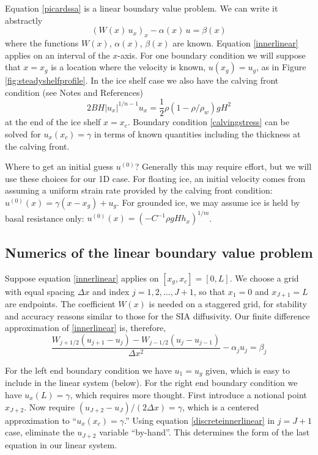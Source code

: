 \documentclass[letterpaper,final,12pt,reqno]{amsart}
\begin{document}
Equation \eqref{picardssa} is a linear boundary value problem.  We can write it abstractly
\begin{equation}
  \left(W(x)\, u_x\right)_x - \alpha(x)\, u = \beta(x)  \label{innerlinear}
\end{equation}
where the functions $W(x)$, $\alpha(x)$, $\beta(x)$ are known.  Equation \eqref{innerlinear} applies on an interval of the $x$-axis.  For one boundary condition we will suppose that $x=x_g$ is a location where the velocity is known, $u(x_g)=u_g$, as in Figure \ref{fig:steadyshelfprofile}.  In the ice shelf case we also have the calving front condition (see Notes and References)
\begin{equation}
  2 B H |u_x|^{1/n - 1} u_x = \frac{1}{2}\rho (1-\rho/\rho_w) g H^2  \label{calvingstress}
\end{equation}
at the end of the ice shelf $x=x_c$.  Boundary condition \eqref{calvingstress} can be solved for $u_x(x_c)=\gamma$ in terms of known quantities including the thickness at the calving front.

Where to get an initial guess $u^{(0)}$?  Generally this may require effort, but we will use these choices for our 1D case.  For floating ice, an initial velocity comes from assuming a uniform strain rate provided by the calving front condition: $u^{(0)}(x) = \gamma (x-x_g) + u_g$.  For grounded ice, we may assume ice is held by basal resistance only: $u^{(0)}(x) = \left(-C^{-1} \rho g H h_x\right)^{1/m}$.

\subsection*{Numerics of the linear boundary value problem}  Suppose equation \eqref{innerlinear} applies on $[x_g,x_c]=[0,L]$.  We choose a grid with equal spacing $\Delta x$ and index $j=1,2,\dots,J+1$, so that $x_1 = 0$ and $x_{J+1} = L$ are endpoints.  The coefficient $W(x)$ is needed on a staggered grid, for stability and accuracy reasons similar to those for the SIA diffusivity.  Our finite difference approximation of \eqref{innerlinear} is, therefore,
\begin{equation}
  \frac{W_{j+1/2} (u_{j+1} - u_j) - W_{j-1/2} (u_{j} - u_{j-1})}{\Delta x^2} - \alpha_j u_j = \beta_j  \label{discreteinnerlinear}
\end{equation}

For the left end boundary condition we have $u_1 = u_g$ given, which is easy to include in the linear system (below).  For the right end boundary condition we have $u_x(L)=\gamma$, which requires more thought.  First introduce a notional point $x_{J+2}$.  Now require $(u_{J+2} - u_J)/(2 \Delta x) = \gamma$, which is a centered approximation to ``$u_x(x_c)=\gamma$.''  Using equation \eqref{discreteinnerlinear} in $j=J+1$ case, eliminate the $u_{J+2}$ variable ``by-hand''.  This determines the form of the last equation in our linear system.
\end{document}
